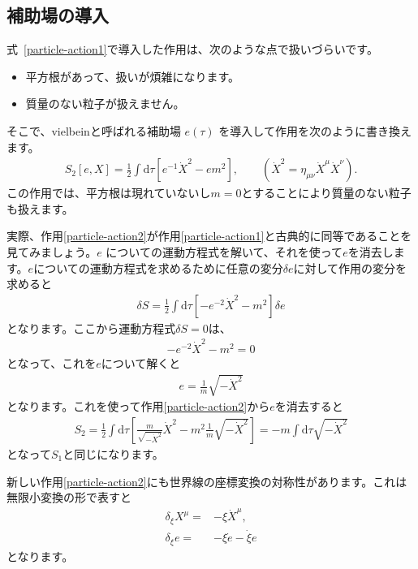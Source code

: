 \documentclass[report,paper=a4, fontsize=12pt, line_length=16cm, number_of_lines=33,dvipdfmx]{jlreq}
\numberwithin{equation}{chapter}
\numberwithin{equation}{section}
\newcommand{\di}{\mathrm{d}}
\begin{document}
\subsection{補助場の導入}
式~\eqref{particle-action1}で導入した作用は、次のような点で扱いづらいです。
\begin{itemize}
 \item 平方根があって、扱いが煩雑になります。
 \item 質量のない粒子が扱えません。
\end{itemize}
そこで、vielbeinと呼ばれる補助場 $e(\tau)$ を導入して作用を次のように書き換えます。
\begin{align}
 S_{2}[e,X]=\frac12 \int \di \tau\left[
e^{-1}\dot{X}^2-em^2
\right],\qquad (\dot{X}^2=\eta_{\mu\nu}\dot{X}^{\mu}\dot{X}^{\nu}).
\label{particle-action2}
\end{align}
この作用では、平方根は現れていないし$m=0$とすることにより質量のない粒子も扱えます。

実際、作用\eqref{particle-action2}が作用\eqref{particle-action1}と古典的に同等であることを見てみましょう。$e$ についての運動方程式を解いて、それを使って$e$を消去します。$e$についての運動方程式を求めるために任意の変分$\delta e$に対して作用の変分を求めると
\begin{align}
 \delta S=\frac12 \int \di \tau\left[
-e^{-2}\dot{X}^2-m^2
\right]\delta e
\end{align}
となります。ここから運動方程式$\delta S=0$は、
\begin{align}
 -e^{-2}\dot{X}^2-m^2=0
\end{align}
となって、これを$e$について解くと
\begin{align}
 e=\frac{1}{m}\sqrt{-\dot{X}^2}
\end{align}
となります。これを使って作用\eqref{particle-action2}から$e$を消去すると
\begin{align}
 S_2=\frac12\int \di \tau\left[
\frac{m}{\sqrt{-\dot{X}^2}}\dot{X}^2
-m^2\frac{1}{m}\sqrt{-\dot{X}^2}
\right]=-m\int \di \tau\sqrt{-\dot{X}^2}
\end{align}
となって$S_1$と同じになります。

新しい作用\eqref{particle-action2}にも世界線の座標変換の対称性があります。これは無限小変換の形で表すと
\begin{equation}
\begin{aligned}
 \delta_{\xi}X^{\mu}=&-\xi \dot{X}^{\mu},\\
\delta_{\xi}e=&-\xi \dot{e}-\dot{\xi} e
\end{aligned} \label{reparam2}
\end{equation}
となります。
\end{document}
